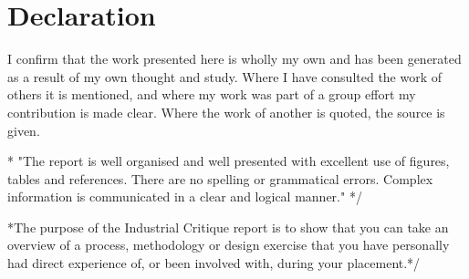 \documentclass[11pt,a4paper,article]{memoir} %
\begin{document}
\chapter*{\large Declaration}
\vspace*{-\baselineskip}
I confirm that the work presented here is wholly my own and has been generated as a result of my own thought and study. Where I have consulted the work of others it is mentioned, and where my work was part of a group effort my contribution is made clear. Where the work of another is quoted, the source is given.


\/* "The report is well organised and well presented
with excellent use of figures, tables and
references. There are no spelling or grammatical
errors. Complex information is communicated in a
clear and logical manner." */

\/*The purpose of the Industrial Critique report is to show that you can take an overview of a
process, methodology or design exercise that you have personally had direct experience of, or
been involved with, during your placement.*/


\end{document}
